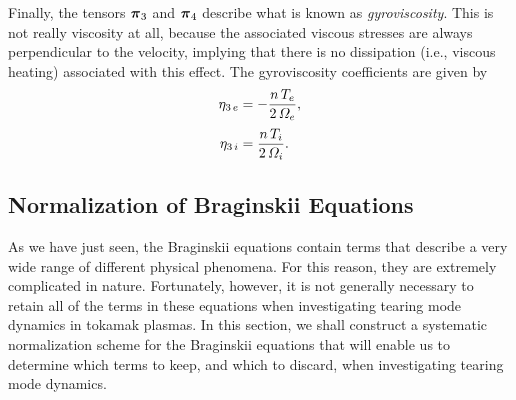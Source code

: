 \documentclass[notitlepage,12pt]{article}
\newcommand{\bpi}{\mbox{\boldmath$\pi$}}
\begin{document}
Finally, the tensors $\bpi_3$ and $\bpi_4$ describe what is known
as {\em gyroviscosity}. This is not really viscosity at all, because the
associated viscous stresses are always perpendicular to the velocity, implying that
there is no dissipation ({\rm i.e.}, viscous heating) associated with
this effect. The gyroviscosity coefficients are given by 
\begin{align}
\eta_{3\,e} &= -\frac{n\,T_e}{2\,{\mit\Omega}_e} ,\\[0.5ex]
\eta_{3\,i} &= \frac{n\,T_i}{2\,{\mit\Omega}_i}.
\end{align}

\subsection{Normalization of Braginskii Equations}\label{s3.9}
As we have just seen, the Braginskii equations contain terms that describe a
very wide range of different physical phenomena. For this reason, they are
extremely complicated in nature. Fortunately, however, it is not generally 
necessary to retain all of
the terms in these equations when investigating tearing mode dynamics in tokamak plasmas. In this section, we shall construct a systematic
normalization scheme for the Braginskii equations that will enable us
to determine which terms to keep, and which to discard, when investigating
tearing mode dynamics. 
\end{document}
